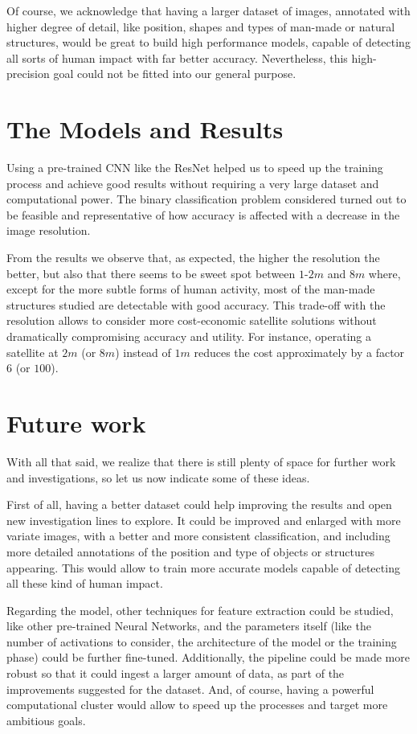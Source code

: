 Of course, we acknowledge that having a larger dataset of images, annotated with higher degree of detail, like position, shapes and types of man-made or natural structures, would be great to build high performance models, capable of detecting all sorts of human impact with far better accuracy. Nevertheless, this high-precision goal could not be fitted into our general purpose.

\section{The Models and Results}

Using a pre-trained CNN like the ResNet helped us to speed up the training process and achieve good results without requiring a very large dataset and computational power. The binary classification problem considered turned out to be feasible and representative of how accuracy is affected with a decrease in the image resolution. 

From the results we observe that, as expected, the higher the resolution the better, but also that there seems to be sweet spot between $1$-$2m$ and $8m$ where, except for the more subtle forms of human activity, most of the man-made structures studied are detectable with good accuracy. This trade-off with the resolution allows to consider more cost-economic satellite solutions without dramatically compromising accuracy and utility. For instance, operating a satellite at $2m$ (or $8m$) instead of $1m$ reduces the cost approximately by a factor 6 (or $100$).

\section{Future work}

With all that said, we realize that there is still plenty of space for further work and investigations, so let us now indicate some of these ideas.

First of all, having a better dataset could help improving the results and open new investigation lines to explore. It could be improved and enlarged with more variate images, with a better and more consistent classification, and including more detailed annotations of the position and type of objects or structures appearing. This would allow to train more accurate models capable of detecting all these kind of human impact.

Regarding the model, other techniques for feature extraction could be studied, like other pre-trained Neural Networks, and the parameters itself (like the number of activations to consider, the architecture of the model or the training phase) could be further fine-tuned. Additionally, the pipeline could be made more robust so that it could ingest a larger amount of data, as part of the improvements suggested for the dataset. And, of course, having a powerful computational cluster would allow to speed up the processes and target more ambitious goals.

